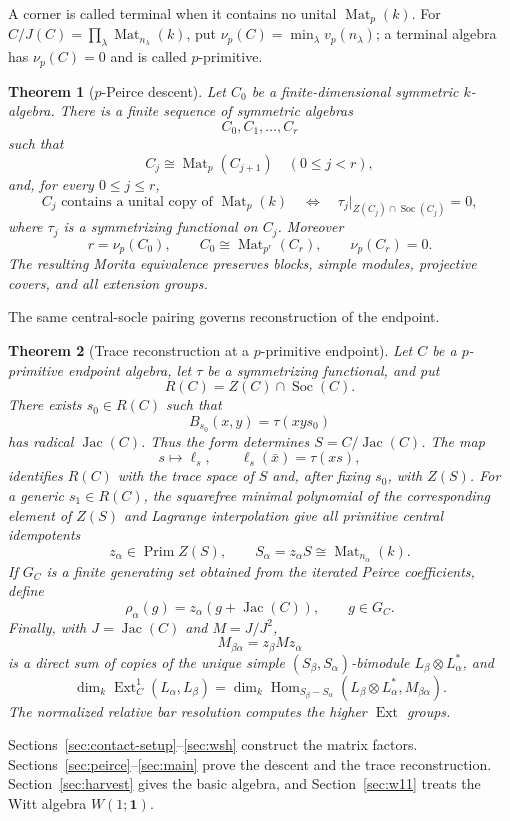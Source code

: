 \documentclass[11pt,reqno]{amsart}
\newtheorem{theorem}{Theorem}[section]
\theoremstyle{definition}
\theoremstyle{remark}
\theoremstyle{definition}
\newcommand{\Mat}{\operatorname{Mat}}
\newcommand{\Jac}{\operatorname{Jac}}
\newcommand{\Soc}{\operatorname{Soc}}
\newcommand{\Hom}{\operatorname{Hom}}
\newcommand{\Ext}{\operatorname{Ext}}
\newcommand{\Prim}{\operatorname{Prim}}
\newcommand{\nuP}{\nu_p}
\begin{document}
A corner is called terminal when it contains no unital $\Mat_p(k)$.
For $C/J(C)=\prod_\lambda\Mat_{n_\lambda}(k)$, put
$\nuP(C)=\min_\lambda v_p(n_\lambda)$; a terminal algebra has
$\nuP(C)=0$ and is called $p$-primitive.

\begin{theorem}[$p$-Peirce descent]\label{thm:uniform-descent}
Let $C_0$ be a finite-dimensional symmetric $k$-algebra.  There is a finite sequence of symmetric algebras
\[
 C_0,C_1,\ldots,C_r
\]
such that
\[
 C_j\cong \Mat_p(C_{j+1})\quad(0\le j<r),
\]
and, for every $0\le j\le r$,
\[
 C_j\text{ contains a unital copy of }\Mat_p(k)
 \quad\Longleftrightarrow\quad
 \tau_j|_{Z(C_j)\cap\Soc(C_j)}=0,
\]
where $\tau_j$ is a symmetrizing functional on $C_j$.  Moreover
\[
 r=\nuP(C_0),\qquad
 C_0\cong\Mat_{p^r}(C_r),\qquad
 \nuP(C_r)=0.
\]
The resulting Morita equivalence preserves blocks, simple modules,
projective covers, and all extension groups.
\end{theorem}

The same central-socle pairing governs reconstruction of the endpoint.

\begin{theorem}[Trace reconstruction at a $p$-primitive endpoint]\label{thm:trace-reconstruction}
Let $C$ be a $p$-primitive endpoint algebra, let $\tau$ be a symmetrizing
functional, and put
\[
 R(C)=Z(C)\cap\Soc(C).
\]
There exists $s_0\in R(C)$ such that
\[
 B_{s_0}(x,y)=\tau(xys_0)
\]
has radical $\Jac(C)$.  Thus the form determines $S=C/\Jac(C)$.  The map
\[
 s\longmapsto \ell_s,\qquad
 \ell_s(\bar x)=\tau(xs),
\]
identifies $R(C)$ with the trace space of $S$ and, after fixing $s_0$, with
$Z(S)$.  For a generic $s_1\in R(C)$, the squarefree minimal polynomial of
the corresponding element of $Z(S)$ and Lagrange interpolation give all
primitive central idempotents
\[
 z_\alpha\in\Prim Z(S),\qquad
 S_\alpha=z_\alpha S\cong\Mat_{n_\alpha}(k).
\]
If $G_C$ is a finite generating set obtained from the iterated Peirce
coefficients, define
\[
 \rho_\alpha(g)=z_\alpha(g+\Jac(C)),\qquad g\in G_C.
\]
Finally, with $J=\Jac(C)$ and $M=J/J^2$,
\[
 M_{\beta\alpha}=z_\beta Mz_\alpha
\]
is a direct sum of copies of the unique simple
$(S_\beta,S_\alpha)$-bimodule $L_\beta\otimes L_\alpha^*$, and
\[
 \dim_k\Ext_C^1(L_\alpha,L_\beta)
 =\dim_k\Hom_{S_\beta-S_\alpha}
 (L_\beta\otimes L_\alpha^*,M_{\beta\alpha}).
\]
The normalized relative bar resolution computes the higher $\Ext$ groups.
\end{theorem}

Sections~\ref{sec:contact-setup}--\ref{sec:wsh} construct the matrix
factors. Sections~\ref{sec:peirce}--\ref{sec:main} prove the descent
and the trace reconstruction. Section~\ref{sec:harvest} gives the
basic algebra, and Section~\ref{sec:w11} treats the Witt algebra
$W(1;\mathbf1)$.
\end{document}
